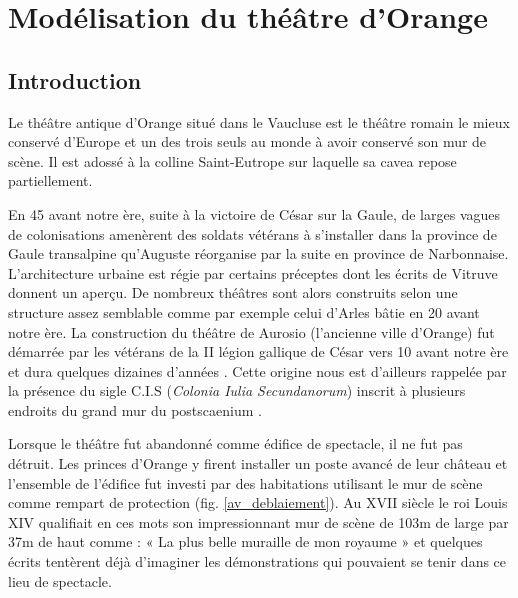 \part{Modélisation du théâtre d’Orange} \label{part_1}

	\chapter*{Introduction}
	  \label{introarcheo}
	 
			 Le théâtre antique d'Orange situé dans le Vaucluse est le théâtre romain le mieux conservé d'Europe et un des trois seuls au monde à avoir conservé son mur de scène. Il est adossé à la colline Saint-Eutrope sur laquelle sa \gls{cavea} repose partiellement.
			 
			 En 45 avant notre ère, suite à la victoire de César sur la Gaule, de larges vagues de colonisations amenèrent des soldats vétérans à s'installer dans la province de Gaule transalpine qu'Auguste réorganise par la suite en province de Narbonnaise. L'architecture urbaine est régie par certains préceptes dont les écrits de Vitruve \cite[Livre V]{vitruve} donnent un aperçu. De nombreux théâtres sont alors construits selon une structure assez semblable comme par exemple celui d'Arles bâtie en 20 avant notre ère. La construction du théâtre de Aurosio (l'ancienne ville d'Orange) fut démarrée par les vétérans de la II légion gallique de César vers 10 avant notre ère et dura quelques dizaines d'années \cite[p. 31]{PouvoirDuTheatre}. Cette origine nous est d'ailleurs rappelée par la présence du sigle C.I.S (\textit{Colonia Iulia Secundanorum}) inscrit à plusieurs endroits du grand mur du \gls{postscaenium} \cite[p26]{formige}.
			 
			 Lorsque le théâtre fut abandonné comme édifice de spectacle, il ne fut pas détruit. Les princes d'Orange y firent installer un poste avancé de leur château et l’ensemble de l’édifice fut investi par des habitations utilisant le mur de scène comme rempart de protection (fig. \ref{av_deblaiement}). Au XVII siècle le roi Louis XIV qualifiait en ces mots son impressionnant mur de scène de 103m de large par 37m de haut comme : « La plus belle muraille de mon royaume » et quelques écrits tentèrent déjà d'imaginer les démonstrations qui pouvaient se tenir dans ce lieu de spectacle. 
			 

